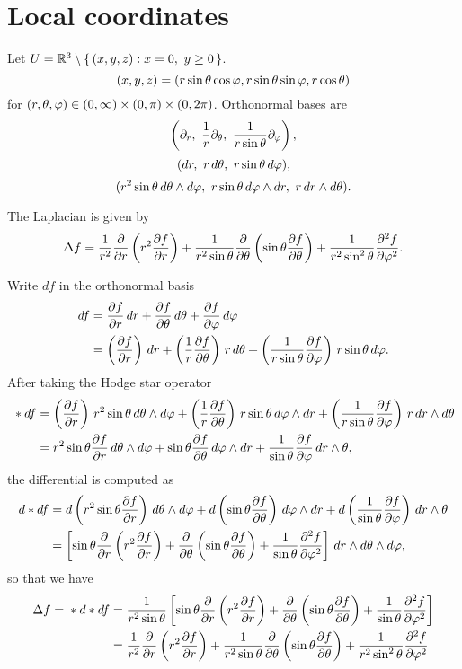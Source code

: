 \documentclass{../../large}
\begin{document}
\section{Local coordinates}

\begin{prb}
Let $U=\R^3\setminus\{\,(x,y,z):x=0,\ y\ge0\,\}$.
\[(x,y,z)=(r\sin\theta\cos\varphi,r\sin\theta\sin\varphi,r\cos\theta)\]
for $(r,\theta,\varphi)\in(0,\infty)\times(0,\pi)\times(0,2\pi)$.
Orthonormal bases are
\[\left(\pd_r,\ \frac1r\pd_\theta,\ \frac1{r\sin\theta}\pd_\f\right),\]
\[(dr,\ r\,d\theta,\ r\sin\theta\,d\varphi),\]
\[(r^2\sin\theta\,d\theta\wedge d\f,\ r\sin\theta\,d\f\wedge dr,\ r\,dr\wedge d\theta).\]
\begin{parts}
\item
\item The Laplacian is given by
\[\Delta f=\frac1{r^2}\pd{r}\left(r^2\pd{f}{r}\right)+\frac1{r^2\sin\theta}\pd{\theta}\left(\sin\theta\pd{f}{\theta}\right)+\frac1{r^2\sin^2\theta}\pd[2]{f}{\f}.\]
\end{parts}
\end{prb}
\begin{pf}
Write $df$ in the orthonormal basis
\begin{align*}
df&=\pd{f}{r}\,dr+\pd{f}{\theta}\,d\theta+\pd{f}{\f}\,d\f\\
&=\left(\pd{f}{r}\right)\,dr+\left(\frac1r\pd{f}{\theta}\right)\,r\,d\theta+\left(\frac1{r\sin\theta}\pd{f}{\f}\right)\,r\sin\theta\,d\f.
\end{align*}
After taking the Hodge star operator
\begin{align*}
{}*df&=\left(\pd{f}{r}\right)\,r^2\sin\theta\,d\theta\wedge d\f+\left(\frac1r\pd{f}{\theta}\right)\,r\sin\theta\,d\f\wedge dr+\left(\frac1{r\sin\theta}\pd{f}{\f}\right)\,r\,dr\wedge d\theta\\
&=r^2\sin\theta\pd{f}{r}\,d\theta\wedge d\f+\sin\theta\pd{f}{\theta}\,d\f\wedge dr+\frac1{\sin\theta}\pd{f}{\f}\,dr\wedge\theta,
\end{align*}
the differential is computed as
\begin{align*}
d*df&=d\left(r^2\sin\theta\pd{f}{r}\right)\,d\theta\wedge d\f+d\left(\sin\theta\pd{f}{\theta}\right)\,d\f\wedge dr+d\left(\frac1{\sin\theta}\pd{f}{\f}\right)\,dr\wedge\theta\\
&=\left[\sin\theta\pd{r}\left(r^2\pd{f}{r}\right)+\pd{\theta}\left(\sin\theta\pd{f}{\theta}\right)+\frac1{\sin\theta}\pd[2]{f}{\f}\right]\,dr\wedge d\theta\wedge d\f,
\end{align*}
so that we have
\begin{align*}
\Delta f={}*d*df&=\frac1{r^2\sin\theta}\left[\sin\theta\pd{r}\left(r^2\pd{f}{r}\right)+\pd{\theta}\left(\sin\theta\pd{f}{\theta}\right)+\frac1{\sin\theta}\pd[2]{f}{\f}\right]\\
&=\frac1{r^2}\pd{r}\left(r^2\pd{f}{r}\right)+\frac1{r^2\sin\theta}\pd{\theta}\left(\sin\theta\pd{f}{\theta}\right)+\frac1{r^2\sin^2\theta}\pd[2]{f}{\f}
\end{align*}

\end{pf}
\end{document}
